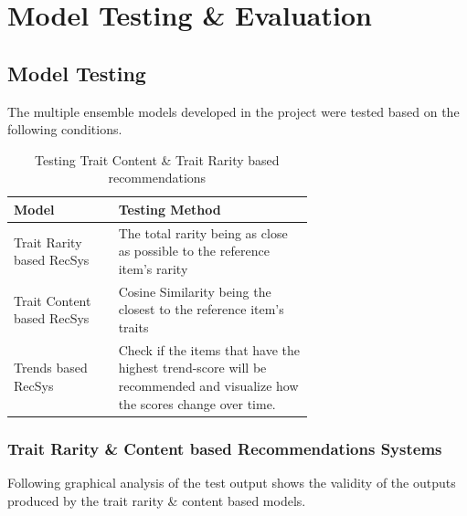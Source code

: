 \section{Model Testing \& Evaluation}

\subsection{Model Testing}



The multiple ensemble models developed in the project were tested based on the following conditions.

\begin{longtable}[h!]{|l|p{0.65\linewidth}|}
\caption{Testing Trait Content \& Trait Rarity based recommendations}
\endfirsthead
\hline
\textbf{Model} & \textbf{Testing Method} \\
\hline
Trait Rarity based RecSys & The total rarity being as close as possible to the reference item's rarity\\
\hline
Trait Content based RecSys & Cosine Similarity being the closest to the reference item's traits\\
\hline
Trends based RecSys & Check if the items that have the highest trend-score will be recommended and visualize how the scores change over time.\\
\hline
\end{longtable}

\subsubsection{Trait Rarity \& Content based Recommendations Systems}

\noindent Following graphical analysis of the test output shows the validity of the outputs produced by the trait rarity \& content based models.


